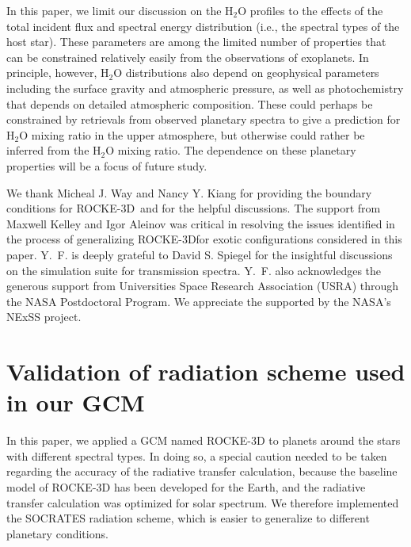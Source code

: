 \documentclass[11pt,numberedappendix,twocolappendix,]{emulateapj}
\def\water{H$_2$O }
\def\modelE{ROCKE-3D}
\begin{document}
In this paper, we limit our discussion on the \water profiles to the effects of the total incident flux and spectral energy distribution (i.e., the spectral types of the host star). 
These parameters are among the limited number of properties that can be constrained relatively easily from the observations of exoplanets. 
In principle, however, \water distributions also depend on geophysical parameters including the surface gravity and atmospheric pressure, as well as photochemistry that depends on detailed atmospheric composition. 
These could perhaps be constrained by retrievals from observed planetary spectra to give a prediction for \water mixing ratio in the upper atmosphere, but  otherwise could rather be inferred from the \water mixing ratio. 
The dependence on these planetary properties will be a focus of future study. 





\acknowledgments
We thank Micheal J. Way and Nancy Y. Kiang for providing the boundary conditions for \modelE \ and for the helpful discussions. 
The support from Maxwell Kelley and Igor Aleinov was critical in resolving the issues identified in the process of generalizing \modelE for exotic configurations considered in this paper. 
Y.~F. is deeply grateful to David S. Spiegel for the insightful discussions on the simulation suite for transmission spectra. 
Y.~F. also acknowledges the generous support from Universities Space Research Association (USRA) through the NASA Postdoctoral Program. 
We appreciate the supported by the NASA's NExSS project. 




\appendix


\section{Validation of radiation scheme used in our GCM}
\label{ap:radiation}

In this paper, we applied a GCM named ROCKE-3D to planets around the stars with different spectral types. 
In doing so, a special caution needed to be taken regarding the accuracy of the radiative transfer calculation, because the baseline model of ROCKE-3D has been developed for the Earth, and the radiative transfer calculation was optimized for solar spectrum. 
We therefore implemented the SOCRATES radiation scheme, which is easier to generalize to different planetary conditions.
\end{document}

